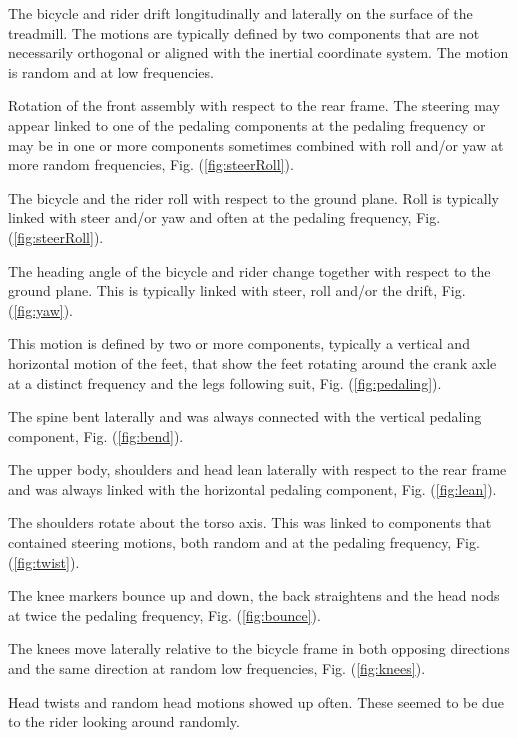 \documentclass[smallextended]{svjour3}     %
\begin{document}
\begin{description}[Pedaling]
    \item[Drift] The bicycle and rider drift longitudinally and laterally on
        the surface of the treadmill. The motions are typically defined by two
        components that are not necessarily orthogonal or aligned with the
        inertial coordinate system. The motion is random and at low
        frequencies.
    \item[Steer] Rotation of the front assembly with respect to the rear frame.
        The steering may appear linked to one of the pedaling components at the
        pedaling frequency or may be in one or more components sometimes
        combined with roll and/or yaw at more random frequencies, Fig.
        (\ref{fig:steerRoll}).
    \item[Roll] The bicycle and the rider roll with respect to the ground
        plane. Roll is typically linked with steer and/or yaw and often at the
        pedaling frequency, Fig. (\ref{fig:steerRoll}).
    \item[Yaw] The heading angle of the bicycle and rider change together with
        respect to the ground plane. This is typically linked with steer, roll
        and/or the drift, Fig. (\ref{fig:yaw}).
    \item[Pedaling] This motion is defined by two or more components, typically
        a vertical and horizontal motion of the feet, that show the feet
        rotating around the crank axle at a distinct frequency and the legs
        following suit, Fig. (\ref{fig:pedaling}).
    \item[Bend] The spine bent laterally and was always connected with the
        vertical pedaling component, Fig. (\ref{fig:bend}).
    \item[Lean] The upper body, shoulders and head lean laterally with respect
        to the rear frame and was always linked with the horizontal pedaling
        component, Fig. (\ref{fig:lean}).
    \item[Twist] The shoulders rotate about the torso axis. This was linked to
        components that contained steering motions, both random and at the
        pedaling frequency, Fig. (\ref{fig:twist}).
    \item[Bounce] The knee markers bounce up and down, the back straightens and
        the head nods at twice the pedaling frequency, Fig.
        (\ref{fig:bounce}).
    \item[Knees] The knees move laterally relative to the bicycle frame in both
        opposing directions and the same direction at random low frequencies,
        Fig. (\ref{fig:knees}).
    \item[Head] Head twists and random head motions showed up often. These
        seemed to be due to the rider looking around randomly.
\end{description}
\end{document}
